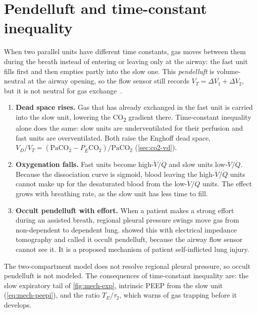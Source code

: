 \section{Pendelluft and time-constant inequality}
\label{sec:mech-pendelluft}
When two parallel units have different time constants, gas moves between them during the breath instead of entering or leaving only at the airway: the fast unit fills first and then empties partly into the slow one. This \emph{pendelluft} is volume-neutral at the airway opening, so the flow sensor still records $V_T = \Delta V_1 + \Delta V_2$, but it is not neutral for gas exchange~\citep{otis1956,robertson1969}.
\begin{enumerate}[leftmargin=*]
  \item \textbf{Dead space rises.} Gas that has already exchanged in the fast unit is carried into the slow unit, lowering the CO\textsubscript{2} gradient there. Time-constant inequality alone does the same: slow units are underventilated for their perfusion and fast units are overventilated. Both raise the Enghoff dead space, $V_D/V_T=(\mathrm{PaCO_2}-P_{\bar E}\mathrm{CO_2})/\mathrm{PaCO_2}$ (\cref{sec:co2-vd}).
  \item \textbf{Oxygenation falls.} Fast units become high-$\dot V/\dot Q$ and slow units low-$\dot V/\dot Q$. Because the dissociation curve is sigmoid, blood leaving the high-$\dot V/\dot Q$ units cannot make up for the desaturated blood from the low-$\dot V/\dot Q$ units. The effect grows with breathing rate, as the slow unit has less time to fill.
  \item \textbf{Occult pendelluft with effort.} When a patient makes a strong effort during an assisted breath, regional pleural pressure swings move gas from non-dependent to dependent lung. \citet{yoshida2013} showed this with electrical impedance tomography and called it occult pendelluft, because the airway flow sensor cannot see it. It is a proposed mechanism of patient self-inflicted lung injury.
\end{enumerate}
The two-compartment model does not resolve regional pleural pressure, so occult pendelluft is not modeled. The consequences of time-constant inequality are: the slow expiratory tail of \cref{fig:mech-exp}, intrinsic PEEP from the slow unit (\cref{eq:mech-peepi}), and the ratio $T_E/\tau_2$, which warns of gas trapping before it develops.


